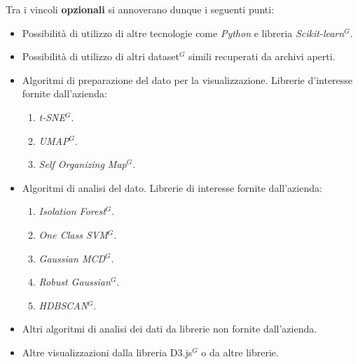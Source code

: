 \noindent Tra i vincoli \textbf{opzionali} si annoverano dunque i seguenti punti:
\begin{itemize}
\item Possibilità di utilizzo di altre tecnologie come \textit{Python} e libreria \textit{Scikit-learn$^{G}$}. 
\item Possibilità di utilizzo di altri dataset$^{G}$ simili recuperati da archivi aperti.
\item Algoritmi di preparazione del dato per la visualizzazione. Librerie d'interesse fornite dall'azienda:
	\begin{enumerate}
                    \item \textit{t-SNE$^{G}$}.
                    \item \textit{UMAP$^{G}$}.
                    \item \textit{Self Organizing Map$^{G}$}.
	\end{enumerate}
\item Algoritmi di analisi del dato. Librerie di interesse fornite dall'azienda:
	\begin{enumerate}
                    \item \textit{Isolation Forest$^{G}$}.
                    \item \textit{One Class SVM$^{G}$}.
                    \item \textit{Gaussian MCD$^{G}$}.
                    \item \textit{Robust Gaussian$^{G}$}.
                    \item \textit{HDBSCAN$^{G}$}.
	\end{enumerate}
\item Altri algoritmi di analisi dei dati da librerie non fornite dall’azienda.
\item Altre visualizzazioni dalla libreria D3.js$^{G}$ o da altre librerie.
\end{itemize}



